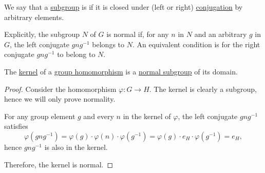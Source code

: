\begin{definition}\label{def:normal_subgroup}
  We say that a \hyperref[def:group/submodel]{subgroup} is  if it is closed under (left or right) \hyperref[def:group_conjugation]{conjugation} by arbitrary elements.

  Explicitly, the subgroup \( N \) of \( G \) is normal if, for any \( n \) in \( N \) and an arbitrary \( g \) in \( G \), the left conjugate \( gng^{-1} \) belongs to \( N \). An equivalent condition is for the right conjugate \( gng^{-1} \) to belong to \( N \).
\end{definition}

\begin{proposition}\label{thm:kernel_is_normal_subgroup}
  The \hyperref[def:group/kernel]{kernel} of a \hyperref[def:group/homomorphism]{group homomorphism} is a \hyperref[def:normal_subgroup]{normal subgroup} of its domain.
\end{proposition}
\begin{proof}
  Consider the homomorphism \( \varphi: G \to H \). The kernel is clearly a subgroup, hence we will only prove normality.

  For any group element \( g \) and every \( n \) in the kernel of \( \varphi \), the left conjugate \( gng^{-1} \) satisfies
  \begin{equation*}
    \varphi(gng^{-1})
    =
    \varphi(g) \cdot \varphi(n) \cdot \varphi(g^{-1})
    =
    \varphi(g) \cdot e_H \cdot \varphi(g^{-1})
    =
    e_H,
  \end{equation*}
  hence \( gng^{-1} \) is also in the kernel.

  Therefore, the kernel is normal.
\end{proof}

